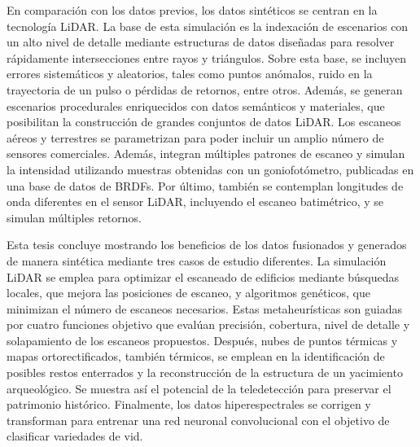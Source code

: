 En comparación con los datos previos, los datos sintéticos se centran en la tecnología LiDAR. La base de esta simulación es la indexación de escenarios con un alto nivel de detalle mediante estructuras de datos diseñadas para resolver rápidamente intersecciones entre rayos y triángulos. Sobre esta base, se incluyen errores sistemáticos y aleatorios, tales como puntos anómalos, ruido en la trayectoria de un pulso o pérdidas de retornos, entre otros. Además, se generan escenarios procedurales enriquecidos con datos semánticos y materiales, que posibilitan la construcción de grandes conjuntos de datos LiDAR. Los escaneos aéreos y terrestres se parametrizan para poder incluir un amplio número de sensores comerciales. Además, integran múltiples patrones de escaneo y simulan la intensidad utilizando muestras obtenidas con un goniofotómetro, publicadas en una base de datos de BRDFs. Por último, también se contemplan longitudes de onda diferentes en el sensor LiDAR, incluyendo el escaneo batimétrico, y se simulan múltiples retornos.

Esta tesis concluye mostrando los beneficios de los datos fusionados y generados de manera sintética mediante tres casos de estudio diferentes. La simulación LiDAR se emplea para optimizar el escaneado de edificios mediante búsquedas locales, que mejora las posiciones de escaneo, y algoritmos genéticos, que minimizan el número de escaneos necesarios. Estas metaheurísticas son guiadas por cuatro funciones objetivo que evalúan precisión, cobertura, nivel de detalle y solapamiento de los escaneos propuestos. Después, nubes de puntos térmicas y mapas ortorectificados, también térmicos, se emplean en la identificación de posibles restos enterrados y la reconstrucción de la estructura de un yacimiento arqueológico. Se muestra así el potencial de la teledetección para preservar el patrimonio histórico. Finalmente, los datos hiperespectrales se corrigen y transforman para entrenar una red neuronal convolucional con el objetivo de clasificar variedades de vid.
